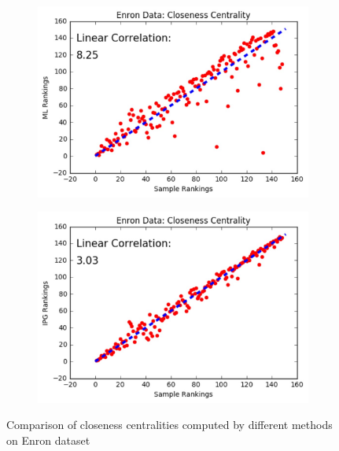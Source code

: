 \documentclass[9pt]{beamer}
\begin{document}
\begin{frame}
\begin{figure}[H]
\begin{subfigure}{.32\textwidth}
    \includegraphics[width=0.95\linewidth]{ECC_ML.jpeg}
\end{subfigure}
\begin{subfigure}{.32\textwidth}
	\centering
    \includegraphics[width=0.95\linewidth]{ECC_IPG.jpeg}
\end{subfigure}
\caption{Comparison of closeness centralities computed by different methods on Enron dataset}
\end{figure}
\end{frame}
\end{document}
